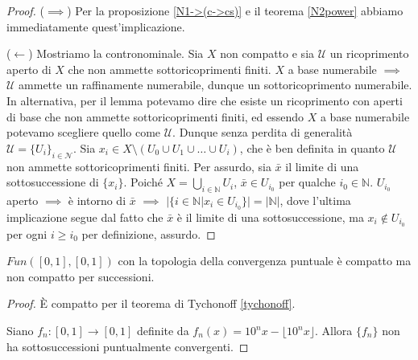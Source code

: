 \begin{proof}
  ($\implies$) Per la proposizione \ref{N1->(c->cs)} e il teorema \ref{N2power} abbiamo immediatamente quest'implicazione.

  ($\leftarrow$) Mostriamo la contronominale. Sia $X$ non compatto e sia $\mathcal{U}$ un ricoprimento aperto di $X$ che non ammette sottoricoprimenti finiti. $X$ a base numerabile $\implies$ $\mathcal{U}$ ammette un raffinamente numerabile, dunque un sottoricoprimento numerabile. In alternativa, per il lemma \label{comp_base} potevamo dire che esiste un ricoprimento con aperti di base che non ammette sottoricoprimenti finiti, ed essendo $X$ a base numerabile potevamo scegliere quello come $\mathcal{U}$.
  Dunque senza perdita di generalità $\mathcal{U}=\{U_i\}_{i \in \mathcal{N}}$. Sia $x_i \in  X \setminus (U_0 \cup U_1 \cup \dots \cup U_i)$, che è ben definita in quanto $\mathcal{U}$ non ammette sottoricoprimenti finiti. Per assurdo, sia $\bar{x}$ il limite di una sottosuccessione di $\{x_i\}$.
  Poiché $\displaystyle X=\bigcup_{i \in \mathbb{N}} U_i$, $\bar{x} \in U_{i_0}$ per qualche $i_0 \in \mathbb{N}$. $U_{i_0}$ aperto $\implies$ è intorno di
  $\bar{x}$ $\implies$ $|\{i \in \mathbb{N} | x_i \in U_{i_0} \}|=|\mathbb{N}|$, dove l'ultima implicazione segue dal fatto che $\bar{x}$ è il limite di una sottosuccessione, ma $x_i \not\in U_{i_0}$ per ogni $i \ge i_0$ per definizione, assurdo.
\end{proof}

\begin{ex}
  \begin{ftt}
    $Fun([0, 1], [0, 1])$ con la topologia della convergenza puntuale è compatto ma non compatto per successioni.
  \end{ftt}
  \begin{proof}
    È compatto per il teorema di Tychonoff \ref{tychonoff}.

    Siano $f_n:[0, 1] \rightarrow [0, 1]$ definite da $f_n(x)=10^nx-\lfloor 10^nx \rfloor$. Allora $\{f_n\}$ non ha sottosuccessioni puntualmente convergenti.
  \end{proof}
\end{ex}
